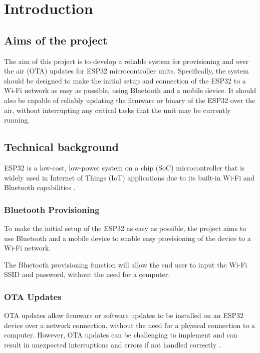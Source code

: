 \section{Introduction}
\label{sec:introduction}

\subsection{Aims of the project}
\label{sec:aims}
The aim of this project is to develop a reliable system for provisioning and over the air (OTA) updates for ESP32 microcontroller units. Specifically, the system should be designed to make the initial setup and connection of the ESP32 to a Wi-Fi network as easy as possible, using Bluetooth and a mobile device. It should also be capable of reliably updating the firmware or binary of the ESP32 over the air, without interrupting any critical tasks that the unit may be currently running.

\subsection{Technical background}
\label{sec:technical}
ESP32 is a low-cost, low-power system on a chip (SoC) microcontroller that is widely used in Internet of Things (IoT) applications due to its built-in Wi-Fi and Bluetooth capabilities \cite{espressif:popularity} \cite{espressif:esp32_datasheet}.

\subsubsection{Bluetooth Provisioning}
\label{subsec:bluetooth}
To make the initial setup of the ESP32 as easy as possible, the project aims to use Bluetooth and a mobile device to enable easy provisioning of the device to a Wi-Fi network.

The Bluetooth provisioning function will allow the end user to input the Wi-Fi SSID and password, without the need for a computer.

\subsubsection{OTA Updates}
\label{subsec:ota}
OTA updates allow firmware or software updates to be installed on an ESP32 device over a network connection, without the need for a physical connection to a computer. However, OTA updates can be challenging to implement and can result in unexpected interruptions and errors if not handled correctly \cite{Arakadakis:2021}.

